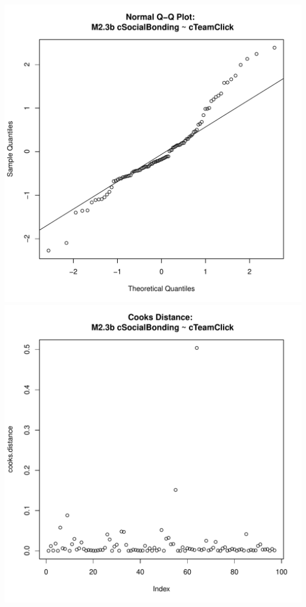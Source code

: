 \documentclass[12pt]{report}
\begin{document}
\includegraphics[scale =.4]{../images/MLM23bQQNorm.pdf}
\includegraphics[scale =.4]{../images/MLM23bCooksD.pdf}
\end{document}
